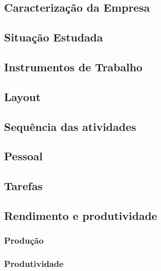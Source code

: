 \documentclass[11pt]{article}
\begin{document}
\subsection{Caracterização da Empresa}



\subsection{Situação Estudada}



\subsection{Instrumentos de Trabalho}



\subsection{Layout}



\subsection{Sequência das atividades}



\subsection{Pessoal}



\subsection{Tarefas}



\subsection{Rendimento e produtividade}



\subsubsection{Produção}



\subsubsection{Produtividade}
\end{document}
